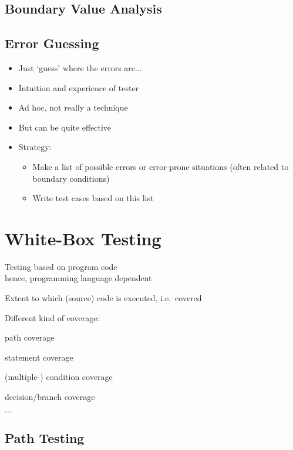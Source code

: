 
\subsection{Boundary Value Analysis}

\subsection{Error Guessing}

\begin{itemize}
	\item Just ‘guess’ where the errors are$\ldots$
	\item Intuition and experience of tester
	\item Ad hoc, not really a technique
	\item But can be quite effective
	\item Strategy:
	\begin{itemize}
		\item Make a list of possible errors or error-prone situations (often related to boundary conditions)
		\item Write test cases based on this list
	\end{itemize}
\end{itemize}

\section{White-Box Testing}

\begin{itemize*}
	\item Testing based on program code\\
	hence, programming language dependent
	\item Extent to which (source) code is executed, i.e.\ covered
	\item Different kind of coverage:
	\begin{itemize*}
		\item path coverage
		\item statement coverage
		\item (multiple-) condition coverage
		\item decision/branch coverage
		\item $\ldots$
	\end{itemize*}
\end{itemize*}

\subsection{Path Testing}

